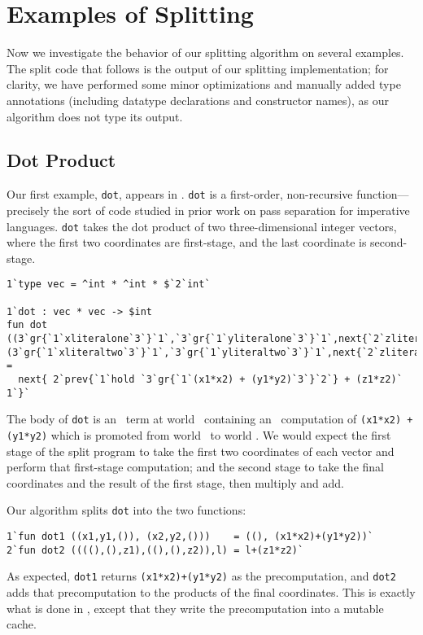  \section{Examples of Splitting}
\label{sec:examples}

Now we investigate the behavior of our splitting algorithm on several examples.
The split code that follows is the output of our splitting implementation; for
clarity, we have performed some minor optimizations and manually added type
annotations (including datatype declarations and constructor names), as our
algorithm does not type its output.

\subsection{Dot Product}

Our first example, \texttt{dot}, appears in \cite{knoblock96}. \texttt{dot} is a
first-order, non-recursive function---precisely the sort of code studied in
prior work on pass separation for imperative languages. \texttt{dot} takes the
dot product of two three-dimensional integer vectors, where the first two
coordinates are first-stage, and the last coordinate is second-stage. 
%
\begin{lstlisting} 
1`type vec = ^int * ^int * $`2`int`

1`dot : vec * vec -> $int
fun dot ((3`gr{`1`xliteralone`3`}`1`,`3`gr{`1`yliteralone`3`}`1`,next{`2`zliteralone`1`}),(3`gr{`1`xliteraltwo`3`}`1`,`3`gr{`1`yliteraltwo`3`}`1`,next{`2`zliteraltwo`1`})) = 
  next{ 2`prev{`1`hold `3`gr{`1`(x1*x2) + (y1*y2)`3`}`2`} + (z1*z2)` 1`}`
\end{lstlisting}
%
The body of \texttt{dot} is an \rmint\ term at world \bbtwo\ containing an
\rmint\ computation of \texttt{(x1*x2) + (y1*y2)} which is promoted from world
\bbonep\ to world \bbtwo. We would expect the first stage of the split program
to take the first two coordinates of each vector and perform that first-stage
computation; and the second stage to take the final coordinates and the result
of the first stage, then multiply and add.

Our algorithm splits \texttt{dot} into the two functions:
%
\begin{lstlisting} 
1`fun dot1 ((x1,y1,()), (x2,y2,()))    = ((), (x1*x2)+(y1*y2))`
2`fun dot2 ((((),(),z1),((),(),z2)),l) = l+(z1*z2)`
\end{lstlisting}
%
As expected, \texttt{dot1} returns \texttt{(x1*x2)+(y1*y2)} as the
precomputation, and \texttt{dot2} adds that precomputation to the products of
the final coordinates. This is exactly what is done in \cite{knoblock96}, except
that they write the precomputation into a mutable cache.


